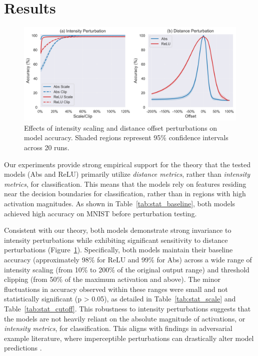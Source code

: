 \section{Results}

\begin{figure}[ht]
  \centering
  \includegraphics[width=\textwidth]{images/perturbation_analysis}
  \caption{Effects of intensity scaling and distance offset perturbations on model accuracy. Shaded regions represent 95\% confidence intervals across 20 runs.}
  \label{fig:perturbation_analysis}
\end{figure}

Our experiments provide strong empirical support for the theory that the tested models (Abs and ReLU) primarily utilize \textit{distance metrics}, rather than \textit{intensity metrics}, for classification. This means that the models rely on features residing near the decision boundaries for classification, rather than in regions with high activation magnitudes. As shown in Table~\ref{tab:stat_baseline}, both models achieved high accuracy on MNIST \citep{lecun1998gradient} before perturbation testing. 

Consistent with our theory, both models demonstrate strong invariance to intensity perturbations while exhibiting significant sensitivity to distance perturbations (Figure~\ref{fig:perturbation_analysis}). Specifically, both models maintain their baseline accuracy (approximately 98\% for ReLU and 99\% for Abs) across a wide range of intensity scaling (from 10\% to 200\% of the original output range) and threshold clipping (from 50\% of the maximum activation and above). The minor fluctuations in accuracy observed within these ranges were small and not statistically significant (p > 0.05), as detailed in Table~\ref{tab:stat_scale} and Table~\ref{tab:stat_cutoff}. This robustness to intensity perturbations suggests that the models are not heavily reliant on the absolute magnitude of activations, or \emph{intensity metrics}, for classification. This aligns with findings in adversarial example literature, where imperceptible perturbations can drastically alter model predictions \citep{szegedy2013intriguing, goodfellow2014explaining}.

